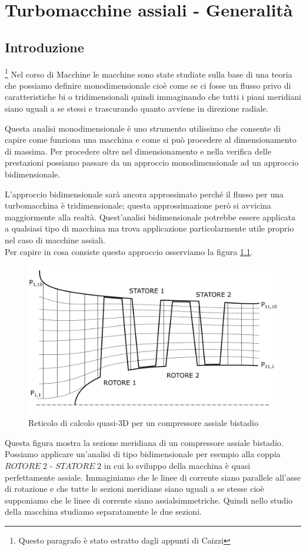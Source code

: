 \chapter{Turbomacchine assiali - Generalità}

\section{Introduzione}
\footnote{Questo paragrafo è stato estratto dagli appunti di Caizzi} Nel corso di Macchine le macchine sono state studiate sulla base di una teoria
che possiamo definire monodimensionale cioè come se ci fosse un flusso privo
di caratteristiche bi o tridimensionali quindi immaginando che tutti i piani
meridiani siano uguali a se stessi e trascurando quanto avviene in direzione
radiale.

Questa analisi monodimensionale è uno strumento utilissimo che consente di
capire come funziona una macchina e come si può procedere al
dimensionamento di massima. Per procedere oltre nel dimensionamento e
nella verifica delle prestazioni possiamo passare da un approccio
monodimensionale ad un approccio bidimensionale.

L’approccio bidimensionale sarà ancora approssimato perché il flusso per una
turbomacchina è tridimensionale; questa approssimazione però si avvicina maggiormente
alla realtà. Quest'analisi bidimensionale potrebbe essere applicata a qualsiasi
tipo di macchina ma trova applicazione particolarmente utile proprio nel caso di
macchine assiali. 
\\Per capire in cosa consiste questo approccio osserviamo la
figura \ref{fig:ReticoloComp}.
\begin{figure}
\centering
  \includegraphics[width=.8\textwidth]{fig/ReticoloComp.pdf}
\caption{Reticolo di calcolo quasi-3D per un compressore assiale bistadio}
\label{fig:ReticoloComp}
\end{figure}
Questa figura mostra la sezione meridiana di un compressore assiale bistadio.
Possiamo applicare un’analisi di tipo bidimensionale per esempio alla coppia
$ROTORE\;2$ - $STATORE\;2$ in cui lo sviluppo della macchina è quasi perfettamente assiale. Immaginiamo che le linee di corrente siano parallele all'asse di
rotazione e che tutte le sezioni meridiane siano uguali a se stesse cioè
supponiamo che le linee di corrente siano assialsimmetriche. Quindi nello studio della macchina studiamo separatamente le due sezioni.

